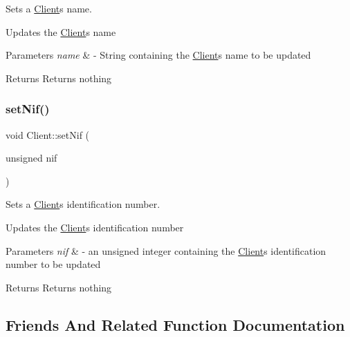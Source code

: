 Sets a \hyperlink{class_client}{Client}\textquotesingle{}s name. 

Updates the \hyperlink{class_client}{Client}\textquotesingle{}s name


\begin{DoxyParams}{Parameters}
{\em name} & -\/ String containing the \hyperlink{class_client}{Client}\textquotesingle{}s name to be updated \\
\hline
\end{DoxyParams}
\begin{DoxyReturn}{Returns}
Returns nothing 
\end{DoxyReturn}
\mbox{\label{class_client_a8d0ab1a3c654d361dacde7e1d2b92c94}} 
\subsubsection{\texorpdfstring{set\+Nif()}{setNif()}}
{\footnotesize\ttfamily void Client\+::set\+Nif (\begin{DoxyParamCaption}\item[{unsigned}]{nif }\end{DoxyParamCaption})}



Sets a \hyperlink{class_client}{Client}\textquotesingle{}s identification number. 

Updates the \hyperlink{class_client}{Client}\textquotesingle{}s identification number


\begin{DoxyParams}{Parameters}
{\em nif} & -\/ an unsigned integer containing the \hyperlink{class_client}{Client}\textquotesingle{}s identification number to be updated \\
\hline
\end{DoxyParams}
\begin{DoxyReturn}{Returns}
Returns nothing 
\end{DoxyReturn}


\subsection{Friends And Related Function Documentation}
\mbox{\label{class_client_a001b1071dc56da194d697f845bbc4b1b}} 
